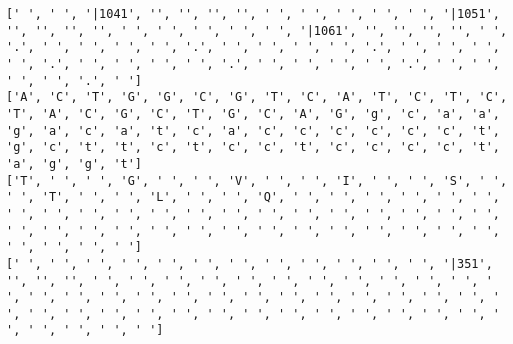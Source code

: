 \documentclass{article}
\begin{document}
\begin{Verbatim}
[' ', ' ', '|1041', '', '', '', '', ' ', ' ', ' ', ' ', ' ', '|1051', '', '', '', '', ' ', ' ', ' ', ' ', ' ', '|1061', '', '', '', '', ' ', '.', ' ', ' ', ' ', ' ', '.', ' ', ' ', ' ', ' ', '.', ' ', ' ', ' ', ' ', '.', ' ', ' ', ' ', ' ', '.', ' ', ' ', ' ', ' ', '.', ' ', ' ', ' ', ' ', '.', ' ']
['A', 'C', 'T', 'G', 'G', 'C', 'G', 'T', 'C', 'A', 'T', 'C', 'T', 'C', 'T', 'A', 'C', 'G', 'C', 'T', 'G', 'C', 'A', 'G', 'g', 'c', 'a', 'a', 'g', 'a', 'c', 'a', 't', 'c', 'a', 'c', 'c', 'c', 'c', 'c', 'c', 't', 'g', 'c', 't', 't', 'c', 't', 'c', 'c', 't', 'c', 'c', 'c', 'c', 't', 'a', 'g', 'g', 't']
['T', ' ', ' ', 'G', ' ', ' ', 'V', ' ', ' ', 'I', ' ', ' ', 'S', ' ', ' ', 'T', ' ', ' ', 'L', ' ', ' ', 'Q', ' ', ' ', ' ', ' ', ' ', ' ', ' ', ' ', ' ', ' ', ' ', ' ', ' ', ' ', ' ', ' ', ' ', ' ', ' ', ' ', ' ', ' ', ' ', ' ', ' ', ' ', ' ', ' ', ' ', ' ', ' ', ' ', ' ', ' ', ' ', ' ', ' ', ' ']
[' ', ' ', ' ', ' ', ' ', ' ', ' ', ' ', ' ', ' ', ' ', ' ', '|351', '', '', '', ' ', ' ', ' ', ' ', ' ', ' ', ' ', ' ', ' ', ' ', ' ', ' ', ' ', ' ', ' ', ' ', ' ', ' ', ' ', ' ', ' ', ' ', ' ', ' ', ' ', ' ', ' ', ' ', ' ', ' ', ' ', ' ', ' ', ' ', ' ', ' ', ' ', ' ', ' ', ' ', ' ', ' ', ' ', ' ']
  

\end{Verbatim}
\end{document}

